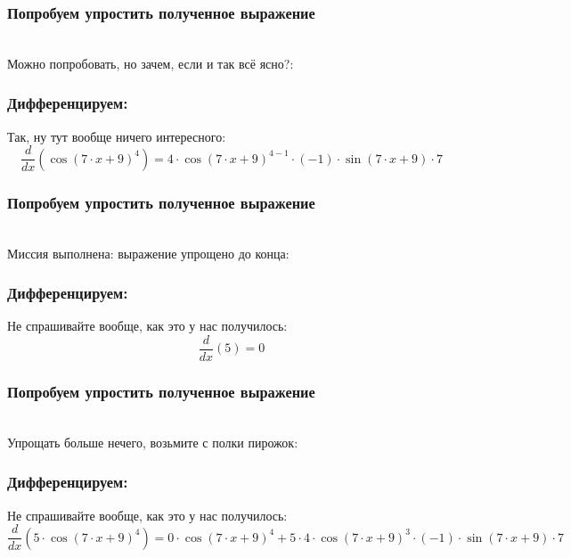 \documentclass[a4paper,12pt]{article}
\begin{document}
\subsubsection*{Попробуем упростить полученное выражение}
\\Можно попробовать, но зачем, если и так всё ясно?:

\subsubsection*{Дифференцируем:}

Так, ну тут вообще ничего интересного:
\begin{dmath}\frac{d}{dx}\left(\operatorname{cos}\left(7\cdot x+ 9\right) ^{4}\right)=4\cdot \operatorname{cos}\left(7\cdot x+ 9\right) ^{4- 1}\cdot (-1)\cdot \operatorname{sin}\left(7\cdot x+ 9\right) \cdot 7\end{dmath}
\subsubsection*{Попробуем упростить полученное выражение}
\\Миссия выполнена: выражение упрощено до конца:

\subsubsection*{Дифференцируем:}

Не спрашивайте вообще, как это у нас получилось:
\begin{dmath}\frac{d}{dx}\left(5\right)=0\end{dmath}
\subsubsection*{Попробуем упростить полученное выражение}
\\Упрощать больше нечего, возьмите с полки пирожок:

\subsubsection*{Дифференцируем:}

Не спрашивайте вообще, как это у нас получилось:
\begin{dmath}\frac{d}{dx}\left(5\cdot \operatorname{cos}\left(7\cdot x+ 9\right) ^{4}\right)=0\cdot \operatorname{cos}\left(7\cdot x+ 9\right) ^{4}+ 5\cdot 4\cdot \operatorname{cos}\left(7\cdot x+ 9\right) ^{3}\cdot (-1)\cdot \operatorname{sin}\left(7\cdot x+ 9\right) \cdot 7\end{dmath}
\end{document}
